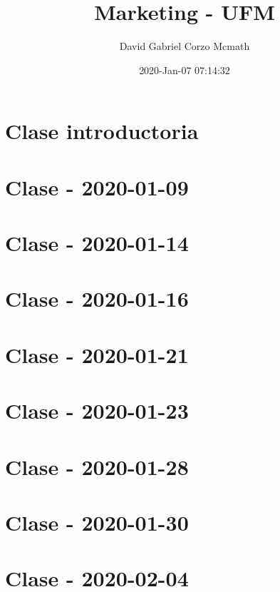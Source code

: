 \documentclass{book}
\title{Marketing - UFM}
\author{David Gabriel Corzo Mcmath}
\date{2020-Jan-07 07:14:32}
\begin{document}
\maketitle
\tableofcontents

\chapter{Clase introductoria}


\chapter{Clase - 2020-01-09}


\chapter{Clase - 2020-01-14}


\chapter{Clase - 2020-01-16}


\chapter{Clase - 2020-01-21}


\chapter{Clase - 2020-01-23}


\chapter{Clase - 2020-01-28}


\chapter{Clase - 2020-01-30}


\chapter{Clase - 2020-02-04}

\end{document}
